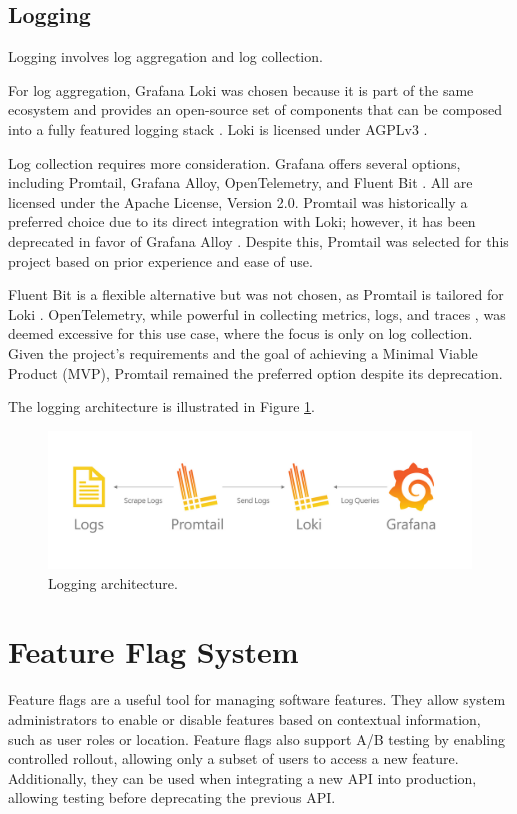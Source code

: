 \subsection{Logging}
Logging involves log aggregation and log collection.

For log aggregation, Grafana Loki was chosen because it is part of the same ecosystem and provides an open-source set of components that can be composed into a fully featured logging stack \parencite{grafana_loki}. Loki is licensed under AGPLv3 \Parencite{grafana_loki_license}.

Log collection requires more consideration. Grafana offers several options, including Promtail, Grafana Alloy, OpenTelemetry, and Fluent Bit \Parencite{grafana_loki_send_data}. All are licensed under the Apache License, Version 2.0. Promtail was historically a preferred choice due to its direct integration with Loki; however, it has been deprecated in favor of Grafana Alloy \Parencite{grafana_promtail}. Despite this, Promtail was selected for this project based on prior experience and ease of use.

Fluent Bit is a flexible alternative but was not chosen, as Promtail is tailored for Loki \Parencite{grafana_loki_send_data}. OpenTelemetry, while powerful in collecting metrics, logs, and traces \Parencite{opentelemetry_overview}, was deemed excessive for this use case, where the focus is only on log collection. Given the project's requirements and the goal of achieving a Minimal Viable Product (MVP), Promtail remained the preferred option despite its deprecation.

The logging architecture is illustrated in Figure \ref{fig:logging_architecture}.

\begin{figure}[h]
    \centering
    \includegraphics[width=1\textwidth]{./images/loki-promtail.png}
    \caption{Logging architecture.}
    \label{fig:logging_architecture}
\end{figure}

\section{Feature Flag System}
Feature flags are a useful tool for managing software features. They allow system administrators to enable or disable features based on contextual information, such as user roles or location. Feature flags also support A/B testing by enabling controlled rollout, allowing only a subset of users to access a new feature. Additionally, they can be used when integrating a new API into production, allowing testing before deprecating the previous API.


